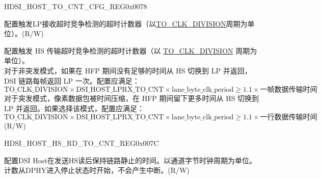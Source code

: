     
    \begin{register}{H}{DSI\_HOST\_TO\_CNT\_CFG\_REG}{0x0078}\label{regdesc:DSIHOSTTOCNTCFGREG}
    \regnewline%
    \begin{regdesc}\begin{reglist}
    \label{fielddesc:DSIHOSTLPRXTOCNT}\item [DSI\_HOST\_LPRX\_TO\_CNT] 配置触发LP接收超时竞争检测的超时计数器（以\hyperref[fielddesc:DSIHOSTTOCLKDIVISION]{TO\_CLK\_DIVISION}周期为单位）。(R/W)
    \label{fielddesc:DSIHOSTHSTXTOCNT}\item [DSI\_HOST\_HSTX\_TO\_CNT] 配置触发 HS 传输超时竞争检测的超时计数器（以 \hyperref[fielddesc:DSIHOSTTOCLKDIVISION]{TO\_CLK\_DIVISION} 周期为单位）。\\
    对于非突发模式，如果在 HFP 期间没有足够的时间从 HS 切换到 LP 并返回，DSI 链路每帧返回 LP 一次。配置应满足：
    \[
    \hyperref[fielddesc:DSIHOSTTOCLKDIVISION]{\text{TO\_CLK\_DIVISION}} \times \hyperref[fielddesc:DSIHOSTLPRXTOCNT]{\text{DSI\_HOST\_LPRX\_TO\_CNT}} \times \text{lane\_byte\_clk\_period} \geq 1.1 \times \text{一帧数据传输时间}
    \]
    对于突发模式，像素数据包被时间压缩，在 HFP 期间留下更多时间从 HS 切换到 LP 并返回。如果选择该模式，配置应满足：
    \[
    \hyperref[fielddesc:DSIHOSTTOCLKDIVISION]{\text{TO\_CLK\_DIVISION}} \times \hyperref[fielddesc:DSIHOSTLPRXTOCNT]{\text{DSI\_HOST\_LPRX\_TO\_CNT}} \times \text{lane\_byte\_clk\_period} \geq 1.1 \times \text{一行数据传输时间}
    \]
    (R/W)
    \end{reglist}\end{regdesc}
    \end{register}
    
    
    \begin{register}{H}{DSI\_HOST\_HS\_RD\_TO\_CNT\_REG}{0x007C}\label{regdesc:DSIHOSTHSRDTOCNTREG}
    \regnewline%
    \begin{regdesc}\begin{reglist}
    \label{fielddesc:DSIHOSTHSRDTOCNT}\item [DSI\_HOST\_HS\_RD\_TO\_CNT] 配置DSI Host在发送HS读后保持链路静止的时间。以通道字节时钟周期为单位。计数从DPHY进入停止状态时开始，不会产生中断。(R/W)
    \end{reglist}\end{regdesc}
    \end{register}
    
